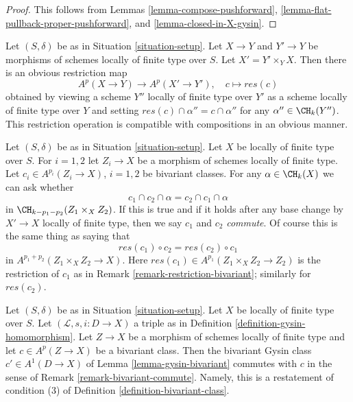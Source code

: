 \begin{proof}
This follows from Lemmas \ref{lemma-compose-pushforward},
\ref{lemma-flat-pullback-proper-pushforward}, and
\ref{lemma-closed-in-X-gysin}.
\end{proof}

\begin{remark}
\label{remark-restriction-bivariant}
Let $(S, \delta)$ be as in Situation \ref{situation-setup}. Let $X \to Y$
and $Y' \to Y$ be morphisms of schemes locally of finite type over $S$.
Let $X' = Y' \times_Y X$. Then there is an obvious restriction map
$$
A^p(X \to Y) \longrightarrow A^p(X' \to Y'),\quad
c \longmapsto res(c)
$$
obtained by viewing a scheme $Y''$ locally of finite type over $Y'$
as a scheme locally of finite type over $Y$ and setting
$res(c) \cap \alpha'' = c \cap \alpha''$ for any $\alpha'' \in \CH_k(Y'')$.
This restriction operation is compatible with compositions in an
obvious manner.
\end{remark}

\begin{remark}
\label{remark-bivariant-commute}
Let $(S, \delta)$ be as in Situation \ref{situation-setup}. Let $X$ be
locally of finite type over $S$. For $i = 1, 2$ let $Z_i \to X$
be a morphism of schemes locally of finite type. Let
$c_i \in A^{p_i}(Z_i \to X)$, $i = 1, 2$ be bivariant classes.
For any $\alpha \in \CH_k(X)$ we can ask whether
$$
c_1 \cap c_2 \cap \alpha = c_2 \cap c_1 \cap \alpha
$$
in $\CH_{k - p_1 - p_2}(Z_1 \times_X Z_2)$. If this is true and if it holds
after any base change by $X' \to X$ locally of finite type, then we say
$c_1$ and $c_2$ {\it commute}. Of course this is the same thing as saying that
$$
res(c_1) \circ c_2 = res(c_2) \circ c_1
$$
in $A^{p_1 + p_2}(Z_1 \times_X Z_2 \to X)$. Here
$res(c_1) \in A^{p_1}(Z_1 \times_X Z_2 \to Z_2)$ is the restriction of $c_1$
as in Remark \ref{remark-restriction-bivariant}; similarly for $res(c_2)$.
\end{remark}

\begin{example}
\label{example-gysin-commute}
Let $(S, \delta)$ be as in Situation \ref{situation-setup}. Let $X$ be locally
of finite type over $S$. Let $(\mathcal{L}, s, i : D \to X)$ a triple as in
Definition \ref{definition-gysin-homomorphism}. Let $Z \to X$ be a morphism
of schemes locally of finite type and let $c \in A^p(Z \to X)$ be a
bivariant class. Then the bivariant Gysin class $c' \in A^1(D \to X)$ of
Lemma \ref{lemma-gysin-bivariant} commutes with $c$ in the sense of
Remark \ref{remark-bivariant-commute}. Namely, this is a restatement of
condition (3) of Definition \ref{definition-bivariant-class}.
\end{example}

